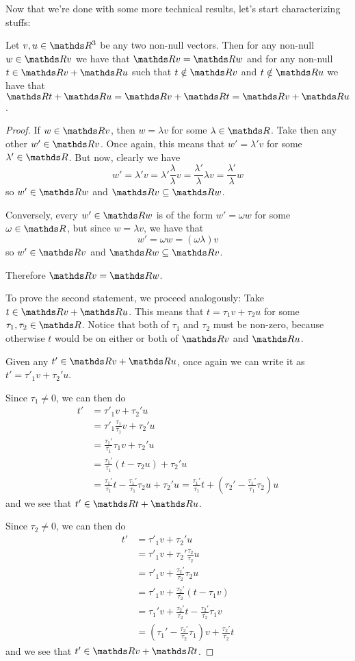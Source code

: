 Now that we're done with some more technical results, let's start characterizing stuffs:

\begin{prop}
	Let $v,u\in \R^3$ be any two non-null vectors. Then for any non-null $w\in\R v$ we have that $\R v=\R w$ and for any non-null $t\in \R v+\R u$ such that $t\notin \R v$ and $t\notin \R u$ we have that $\R t+\R u=\R v+\R t=\R v+\R u$.
\end{prop}
\begin{proof}
	If $w\in \R v$, then $w=\lambda v$ for some $\lambda\in \R$. Take then any other $w'\in \R v$. Once again, this means that $w'=\lambda' v$ for some $\lambda'\in \R$. But now, clearly we have
	\[w'=\lambda'v=\lambda'\frac{\lambda}{\lambda}v=\frac{\lambda'}{\lambda}\lambda v=\frac{\lambda'}{\lambda}w\]so $w'\in \R w$ and $\R v\subseteq \R w$.
	
	Conversely, every $w'\in \R w$ is of the form $w'=\omega w$ for some $\omega\in \R$, but since $w=\lambda v$, we have that
	\[w'=\omega w=(\omega \lambda) v\]so $w'\in \R v$ and $\R w\subseteq \R v$.
	
	Therefore $\R v=\R w$.
	
	\bigskip
	To prove the second statement, we proceed analogously: Take $t\in \R v+\R u$. This means that $t=\tau_1 v+\tau_2 u$ for some $\tau_1,\tau_2\in \R$. Notice that both of $\tau_1$ and $\tau_2$ must be non-zero, because otherwise $t$ would be on either or both of $\R v$ and $\R u$.
	
	Given any $t'\in \R v+\R u$, once again we can write it as $t'=\tau'_1 v+\tau_2' u$.
	
	Since $\tau_1\neq0$, we can then do
	\begin{align*}
		t'&=\tau'_1 v+\tau_2' u\\
		&=\tau'_1\frac{\tau_1}{\tau_1}v+\tau_2'u\\
		&=\frac{\tau_1'}{\tau_1}\tau_1v+\tau_2'u\\
		&=\frac{\tau_1'}{\tau_1}(t-\tau_2u)+\tau_2'u\\
		&=\frac{\tau_1'}{\tau_1}t-\frac{\tau_1'}{\tau_1}\tau_2u+\tau_2'u=\frac{\tau_1'}{\tau_1}t+\left(\tau_2'-\frac{\tau_1'}{\tau_1}\tau_2\right)u
	\end{align*}and we see that $t'\in \R t+\R u$.
	
	Since $\tau_2\neq 0$, we can then do
	\begin{align*}
	t'&=\tau'_1 v+\tau_2' u\\
	&=\tau'_1v+\tau_2'\frac{\tau_2}{\tau_2}u\\
	&=\tau'_1v+\frac{\tau_2'}{\tau_2}\tau_2u\\
	&=\tau'_1v+\frac{\tau_2'}{\tau_2}(t-\tau_1v)\\
	&=\tau_1'v+\frac{\tau_2'}{\tau_2}t-\frac{\tau_2'}{\tau_2}\tau_1v\\
	&=\left(\tau_1'-\frac{\tau_2'}{\tau_2}\tau_1\right)v+\frac{\tau_2'}{\tau_2}t
	\end{align*}and we see that $t'\in \R v+\R t$.
	

\end{proof}
